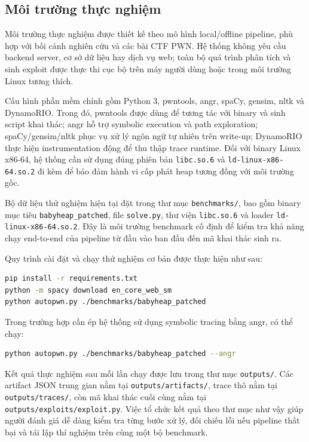 \documentclass[final]{hcmuitthesis}
\begin{document}
\subsection{Môi trường thực nghiệm}
Môi trường thực nghiệm được thiết kế theo mô hình local/offline pipeline, phù hợp với bối cảnh nghiên cứu và các bài CTF PWN. Hệ thống không yêu cầu backend server, cơ sở dữ liệu hay dịch vụ web; toàn bộ quá trình phân tích và sinh exploit được thực thi cục bộ trên máy người dùng hoặc trong môi trường Linux tương thích.

Cấu hình phần mềm chính gồm Python 3, pwntools, angr, spaCy, gensim, nltk và DynamoRIO. Trong đó, pwntools được dùng để tương tác với binary và sinh script khai thác; angr hỗ trợ symbolic execution và path exploration; spaCy/gensim/nltk phục vụ xử lý ngôn ngữ tự nhiên trên write-up; DynamoRIO thực hiện instrumentation động để thu thập trace runtime. Đối với binary Linux x86-64, hệ thống cần sử dụng đúng phiên bản \texttt{libc.so.6} và \texttt{ld-linux-x86-64.so.2} đi kèm để bảo đảm hành vi cấp phát heap tương đồng với môi trường gốc.

Bộ dữ liệu thử nghiệm hiện tại đặt trong thư mục \texttt{benchmarks/}, bao gồm binary mục tiêu \texttt{babyheap\_patched}, file \texttt{solve.py}, thư viện \texttt{libc.so.6} và loader \texttt{ld-linux-x86-64.so.2}. Đây là môi trường benchmark cố định để kiểm tra khả năng chạy end-to-end của pipeline từ đầu vào ban đầu đến mã khai thác sinh ra.

Quy trình cài đặt và chạy thử nghiệm cơ bản được thực hiện như sau:
\begin{lstlisting}[language=bash]
pip install -r requirements.txt
python -m spacy download en_core_web_sm
python autopwn.py ./benchmarks/babyheap_patched
\end{lstlisting}

Trong trường hợp cần ép hệ thống sử dụng symbolic tracing bằng angr, có thể chạy:
\begin{lstlisting}[language=bash]
python autopwn.py ./benchmarks/babyheap_patched --angr
\end{lstlisting}

Kết quả thực nghiệm sau mỗi lần chạy được lưu trong thư mục \texttt{outputs/}. Các artifact JSON trung gian nằm tại \texttt{outputs/artifacts/}, trace thô nằm tại \texttt{outputs/traces/}, còn mã khai thác cuối cùng nằm tại \texttt{outputs/exploits/exploit.py}. Việc tổ chức kết quả theo thư mục như vậy giúp người đánh giá dễ dàng kiểm tra từng bước xử lý, đối chiếu lỗi nếu pipeline thất bại và tái lập thí nghiệm trên cùng một bộ benchmark.
\end{document}
